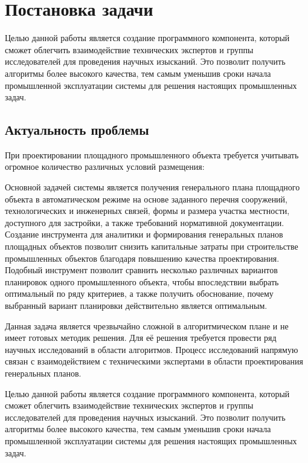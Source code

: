 \section*{\Large{Постановка задачи}}


Целью данной работы является создание программного компонента,
который сможет облегчить взаимодействие технических экспертов
и группы исследователей для проведения научных изысканий.
Это позволит получить алгоритмы более высокого качества,
тем самым уменьшив сроки начала промышленной эксплуатации системы для решения настоящих промышленных задач.


\subsection*{\large{Актуальность проблемы}}

При проектировании площадного промышленного объекта требуется учитывать огромное количество различных
условий размещения:


Основной задачей системы является получения генерального
плана площадного объекта в автоматическом режиме
на основе заданного перечня сооружений,
технологических и инженерных связей, формы и размера участка местности,
доступного для застройки, а также требований нормативной документации.
Создание инструмента для аналитики и формирования генеральных планов
площадных объектов позволит снизить капитальные затраты
при строительстве промышленных объектов благодаря повышению качества проектирования.
Подобный инструмент позволит сравнить несколько различных вариантов планировок
одного промышленного объекта, чтобы впоследствии выбрать оптимальный по ряду критериев,
а также получить обоснование, почему выбранный вариант планировки действительно является оптимальным.




Данная задача является чрезвычайно сложной в алгоритмическом плане и не имеет готовых методик решения.
Для её решения требуется провести ряд научных исследований в области алгоритмов.
Процесс исследований напрямую связан с взаимодействием
с техническими экспертами в области проектирования генеральных планов.


Целью данной работы является создание программного компонента, который сможет облегчить взаимодействие 
технических экспертов и группы исследователей для проведения научных изысканий. 
Это позволит получить алгоритмы более высокого качества, 
тем самым уменьшив сроки начала промышленной эксплуатации системы для решения настоящих промышленных задач.